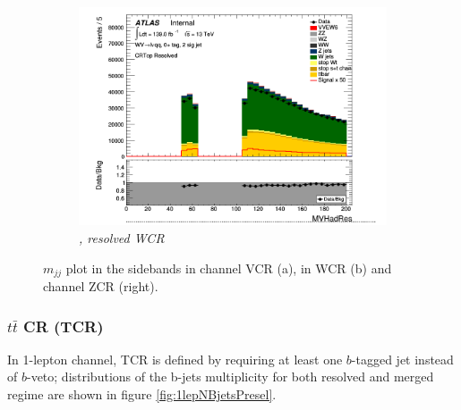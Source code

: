 \begin{figure}[ht]
    \centering
    \begin{subfigure}{0.3\textwidth}
        \includegraphics[width=\linewidth]{figures/1lep/CRPlots/C_0ptag2pjet_0ptv_CRVjet_MVHadRes_Lin.png}
        \caption{\emph{\olep, resolved WCR}}
    \end{subfigure}
    \caption{$m_{jj}$ plot in the sidebands in \zlep channel VCR (a), in \olep WCR (b) and \tlep channel ZCR (right).}
    \label{fig:1lep2lepMVHadResCR}
\end{figure}


\subsubsection{$t\bar{t}$ CR (TCR)}


In 1-lepton channel, TCR is defined by requiring at least one $b$-tagged jet instead of $b$-veto; distributions of the b-jets multiplicity for both resolved and merged regime are shown in figure \ref{fig:1lepNBjetsPresel}. 

